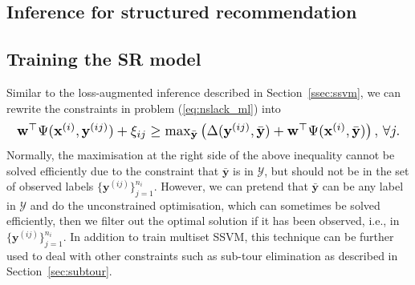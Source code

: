 


\subsection{Inference for structured recommendation}
\label{ssec:SRinf}



\subsection{Training the SR model}
\label{ssec:SRtrain}


Similar to the loss-augmented inference described in Section~\ref{ssec:ssvm}, 
we can rewrite the constraints in problem (\ref{eq:nslack_ml}) into
\begin{equation*}
\resizebox{0.99\linewidth}{!}
{$
\mathbf{w}^\top \Psi(\mathbf{x}^{(i)}, \mathbf{y}^{(ij)}) + \xi_{ij} \ge 
\max_{\bar{\mathbf{y}}} \left( \Delta(\mathbf{y}^{(ij)}, \bar{\mathbf{y}}) + \mathbf{w}^\top \Psi(\mathbf{x}^{(i)}, \bar{\mathbf{y}}) \right),
\, \forall j.
$}
\end{equation*} 
Normally, the maximisation at the right side of the above inequality cannot be solved efficiently due to the constraint that 
$\bar{\mathbf{y}}$ is in $\mathcal{Y}$,
but should not be in the set of observed labels $\{\mathbf{y}^{(ij)}\}_{j=1}^{n_i}$.
However, we can pretend that $\bar{\mathbf{y}}$ can be any label in $\mathcal{Y}$ and do the unconstrained optimisation,
which can sometimes be solved efficiently, then we filter out the optimal solution if it has been observed, 
i.e., in $\{\mathbf{y}^{(ij)}\}_{j=1}^{n_i}$. 
In addition to train multiset SSVM, this technique can be further used to deal with other constraints such as sub-tour elimination 
as described in Section~\ref{sec:subtour}.






